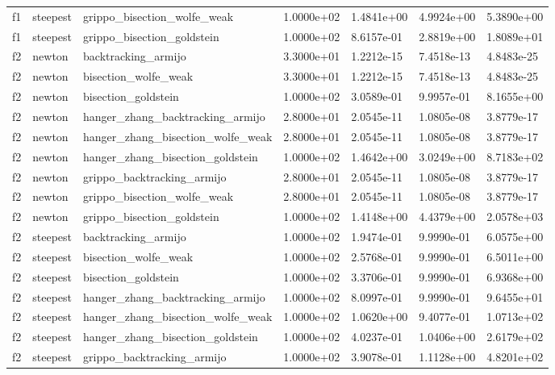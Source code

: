 \documentclass[a4paper,11pt]{article}
\numberwithin{equation}{section} %
\begin{document}
\begin{longtable}{p{1.5cm}|p{1.5cm}|p{4cm}|p{2cm}|p{2cm}|p{2cm}|p{2cm}}
        f1 & steepest & grippo\_bisection\_wolfe\_weak & 1.0000e+02 & 1.4841e+00 & 4.9924e+00 & 5.3890e+00 \\
        f1 & steepest & grippo\_bisection\_goldstein & 1.0000e+02 & 8.6157e-01 & 2.8819e+00 & 1.8089e+01 \\
        f2 & newton & backtracking\_armijo & 3.3000e+01 & 1.2212e-15 & 7.4518e-13 & 4.8483e-25 \\
        f2 & newton & bisection\_wolfe\_weak & 3.3000e+01 & 1.2212e-15 & 7.4518e-13 & 4.8483e-25 \\
        f2 & newton & bisection\_goldstein & 1.0000e+02 & 3.0589e-01 & 9.9957e-01 & 8.1655e+00 \\
        f2 & newton & hanger\_zhang\_backtracking\_armijo & 2.8000e+01 & 2.0545e-11 & 1.0805e-08 & 3.8779e-17 \\
        f2 & newton & hanger\_zhang\_bisection\_wolfe\_weak & 2.8000e+01 & 2.0545e-11 & 1.0805e-08 & 3.8779e-17 \\
        f2 & newton & hanger\_zhang\_bisection\_goldstein & 1.0000e+02 & 1.4642e+00 & 3.0249e+00 & 8.7183e+02 \\
        f2 & newton & grippo\_backtracking\_armijo & 2.8000e+01 & 2.0545e-11 & 1.0805e-08 & 3.8779e-17 \\
        f2 & newton & grippo\_bisection\_wolfe\_weak & 2.8000e+01 & 2.0545e-11 & 1.0805e-08 & 3.8779e-17 \\
        f2 & newton & grippo\_bisection\_goldstein & 1.0000e+02 & 1.4148e+00 & 4.4379e+00 & 2.0578e+03 \\
        f2 & steepest & backtracking\_armijo & 1.0000e+02 & 1.9474e-01 & 9.9990e-01 & 6.0575e+00 \\
        f2 & steepest & bisection\_wolfe\_weak & 1.0000e+02 & 2.5768e-01 & 9.9990e-01 & 6.5011e+00 \\
        f2 & steepest & bisection\_goldstein & 1.0000e+02 & 3.3706e-01 & 9.9990e-01 & 6.9368e+00 \\
        f2 & steepest & hanger\_zhang\_backtracking\_armijo & 1.0000e+02 & 8.0997e-01 & 9.9990e-01 & 9.6455e+01 \\
        f2 & steepest & hanger\_zhang\_bisection\_wolfe\_weak & 1.0000e+02 & 1.0620e+00 & 9.4077e-01 & 1.0713e+02 \\
        f2 & steepest & hanger\_zhang\_bisection\_goldstein & 1.0000e+02 & 4.0237e-01 & 1.0406e+00 & 2.6179e+02 \\
        f2 & steepest & grippo\_backtracking\_armijo & 1.0000e+02 & 3.9078e-01 & 1.1128e+00 & 4.8201e+02 \\

\end{longtable}
\end{document}
